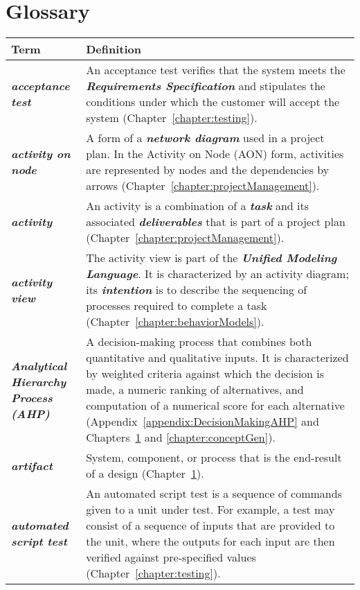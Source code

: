 \chapter{Glossary}
\label{chapter:projectSelection}

\begin{longtable} { p{4cm} p{11cm}} 

Term & Definition \\ 
\endhead

\emph{\textbf{acceptance test}} &
An acceptance test verifies that the system meets the  
\emph{\textbf{Requirements Specification}} and stipulates the conditions
under which the customer will accept the system (Chapter~\ref{chapter:testing}). \\

\emph{\textbf{activity on node}} & A form of a \emph{\textbf{network
diagram}} used in a project plan. In the Activity on Node (AON) form,
activities are represented by nodes and the dependencies by arrows
(Chapter~\ref{chapter:projectManagement}). \\

\emph{\textbf{activity}} & An activity is a combination of a
\emph{\textbf{task}} and its associated \emph{\textbf{deliverables}}
that is part of a project plan (Chapter~\ref{chapter:projectManagement}). \\

\emph{\textbf{activity view}} & The activity view is part of the
\emph{\textbf{Unified Modeling Language}}. It is characterized by an
activity diagram; its \emph{\textbf{intention}} is to describe the
sequencing of processes required to complete a task (Chapter~\ref{chapter:behaviorModels}). \\

\emph{\textbf{Analytical Hierarchy Process (AHP)}} & A decision-making
process that combines both quantitative and qualitative inputs. It is
characterized by weighted criteria against which the decision is made, a
numeric ranking of alternatives, and computation of a numerical score
for each alternative (Appendix~\ref{appendix:DecisionMakingAHP} and 
Chapters~\ref{chapter:projectSelection} and \ref{chapter:conceptGen}). \\

\emph{\textbf{artifact}} & System, component, or process that is the
end-result of a design (Chapter~\ref{chapter:projectSelection}). \\

\emph{\textbf{automated script test}} & An automated script test is a
sequence of commands given to a unit under test. For example, a test may
consist of a sequence of inputs that are provided to the unit, where the
outputs for each input are then verified against pre-specified values
(Chapter~\ref{chapter:testing}). \\


\end{longtable}
